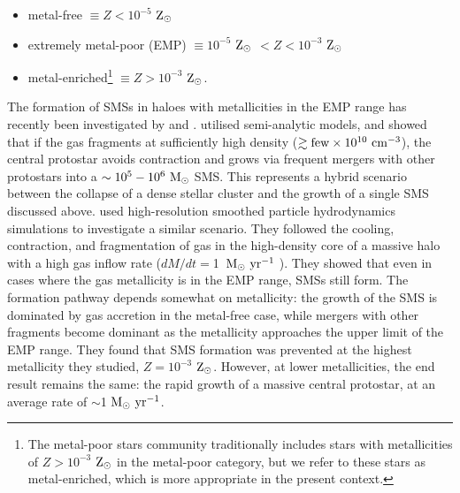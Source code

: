 \documentclass[graphics, twocolumn, usenatbib]{mn2e}
\newcommand{\msolaryr} {$\rm{M_{\odot}~yr^{-1}}~$}
\newcommand{\msolaryrc} {$\rm{M_{\odot}~yr^{-1}}$}
\newcommand{\zsolar} {$\rm{Z_{\odot}}~$}
\newcommand{\zsolarc} {$\rm{Z_{\odot}}$}
\begin{document}
\begin{itemize}
\item metal-free $\equiv Z < 10^{-5}$ \zsolarc 
\item extremely metal-poor (EMP) $\equiv 10^{-5}$ \zsolar $< Z < 10^{-3}$ \zsolarc 
\item metal-enriched\footnote{The metal-poor stars community traditionally includes stars with
  metallicities of $Z > 10^{-3}$ \zsolar in the metal-poor category, but we refer to these stars as metal-enriched, which 
  is more appropriate in the present context.} $\equiv Z > 10^{-3}$ \zsolarc.
\end{itemize}
  The formation of SMSs in haloes with metallicities in the EMP range
  has recently been investigated by \cite{Tagawa_2020} and \cite{Chon_2020}. \cite{Tagawa_2020}  utilised semi-analytic models, and showed that if the gas fragments at sufficiently high density ($\gtrsim {\rm few}\times 10^{10}~{\rm cm^{-3}}$), the central protostar avoids contraction and  grows via frequent mergers with other protostars into a $\sim 10^5-10^6~{\rm M_\odot}$ SMS. This represents a hybrid scenario between the collapse of a dense stellar cluster and the growth of a single SMS discussed above.
   \cite{Chon_2020} used high-resolution smoothed particle
  hydrodynamics simulations to investigate a similar scenario. They followed the cooling, contraction, and fragmentation of gas in the high-density core of a massive halo with a high gas inflow rate ($dM/dt=$1~\msolaryr).  They showed that even in cases where the gas metallicity is in the EMP range, SMSs still form. The formation pathway depends somewhat on metallicity: the growth of the SMS is dominated by gas accretion in the metal-free case, while mergers with other fragments become dominant as the metallicity approaches the upper limit of the EMP range. They found that SMS formation was prevented at the highest metallicity they studied, $Z=10^{-3}$ \zsolarc. However, at lower metallicities, the end result remains the same: the rapid growth of a massive central protostar, at an average rate of $\sim$1 \msolaryrc.
  
\end{document}
